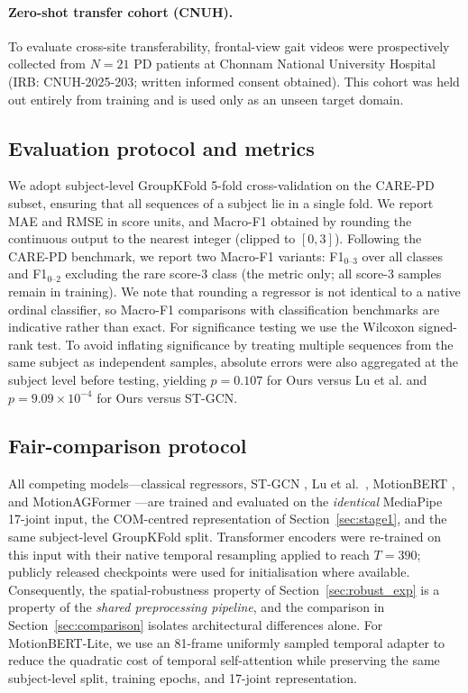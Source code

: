 \documentclass[preprint,12pt]{elsarticle}
\begin{document}
\paragraph{Zero-shot transfer cohort (CNUH).}
To evaluate cross-site transferability, frontal-view gait videos were
prospectively collected from $N=21$ PD patients at Chonnam National University
Hospital (IRB: CNUH-2025-203; written informed consent obtained). This cohort
was held out entirely from training and is used only as an unseen target
domain.

\subsection{Evaluation protocol and metrics}
\label{sec:metrics}
We adopt subject-level GroupKFold 5-fold cross-validation on the CARE-PD subset,
ensuring that all sequences of a subject lie in a single fold. We report MAE and
RMSE in score units, and Macro-F1 obtained by rounding the continuous output to
the nearest integer (clipped to $[0,3]$). Following the CARE-PD benchmark, we
report two Macro-F1 variants: F1$_{0\text{--}3}$ over all classes and
F1$_{0\text{--}2}$ excluding the rare score-3 class (the metric only; all
score-3 samples remain in training). We note that rounding a regressor is not
identical to a native ordinal classifier, so Macro-F1 comparisons with
classification benchmarks are indicative rather than exact. For significance
testing we use the Wilcoxon signed-rank test. To avoid inflating significance by
treating multiple sequences from the same subject as independent samples,
absolute errors were also aggregated at the subject level before testing,
yielding $p=0.107$ for Ours versus Lu et al. and
$p=9.09\times10^{-4}$ for Ours versus ST-GCN.

\subsection{Fair-comparison protocol}
\label{sec:fairness}
All competing models---classical regressors, ST-GCN \cite{yan2018spatial},
Lu et al.\ \cite{lu2020vision}, MotionBERT \cite{zhu2023motionbert}, and
MotionAGFormer \cite{mehraban2024motionagformer}---are trained and evaluated on
the \emph{identical} MediaPipe 17-joint input, the COM-centred
representation of Section~\ref{sec:stage1}, and the same subject-level
GroupKFold split. Transformer encoders were re-trained on this input with their
native temporal resampling applied to reach $T=390$; publicly released
checkpoints were used for initialisation where available. Consequently, the
spatial-robustness property of Section~\ref{sec:robust_exp} is a property of
the \emph{shared preprocessing pipeline}, and the comparison in
Section~\ref{sec:comparison} isolates architectural differences alone.
For MotionBERT-Lite, we use an 81-frame uniformly sampled temporal adapter to
reduce the quadratic cost of temporal self-attention while preserving the same
subject-level split, training epochs, and 17-joint representation.
\end{document}

